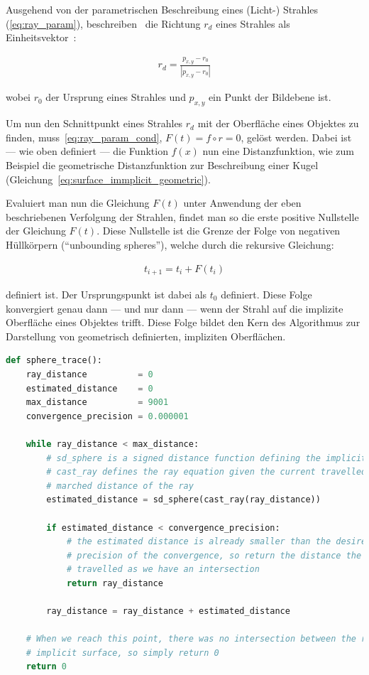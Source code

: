 Ausgehend von der parametrischen Beschreibung eines (Licht-) Strahles
(\autoref{eq:ray_param}), beschreiben~\citeauthor{hart_ray_1989} die
Richtung $r_{d}$ eines Strahles als Einheitsvektor~\parencite[S.
291]{hart_ray_1989}:

\begin{gather}
    r_{d} = \frac{p_{x, y} - r_{0}}{|p_{x, y} - r_{0}|}
\end{gather}

wobei $r_{0}$ der Ursprung eines Strahles und $p_{x, y}$ ein Punkt der Bildebene ist.

Um nun den Schnittpunkt eines Strahles $r_{d}$ mit der Oberfläche eines
Objektes zu finden, muss~\autoref{eq:ray_param_cond}, $F(t) = f \circ
r = 0$, gelöst werden. Dabei ist --- wie oben definiert --- die Funktion
$f(x)$ nun eine Distanzfunktion, wie zum Beispiel die geometrische
Distanzfunktion zur Beschreibung einer Kugel
(Gleichung~\ref{eq:surface_immplicit_geometric}).

Evaluiert man nun die Gleichung $F(t)$ unter Anwendung der eben beschriebenen
Verfolgung der Strahlen, findet man so die erste positive Nullstelle der Gleichung
$F(t)$. Diese Nullstelle ist die Grenze der Folge von negativen Hüllkörpern
(``unbounding spheres''), welche durch die rekursive Gleichung:

\begin{gather}
    t_{i+1} = t_{i} + F(t_{i})
\end{gather}

definiert ist. Der Ursprungspunkt ist dabei als $t_{0}$ definiert. Diese Folge
konvergiert genau dann --- und nur dann --- wenn der Strahl auf die implizite
Oberfläche eines Objektes trifft. Diese Folge bildet den Kern des Algorithmus
zur Darstellung von geometrisch definierten, impliziten Oberflächen.

\begin{lstlisting}[language=Python,caption={Eine abstrakte Umsetzung des Sphere
        Tracings\protect\footnotemark.},label={alg:sphere_tracing},captionpos=b,emph={sphere_trace}]
def sphere_trace():
    ray_distance          = 0
    estimated_distance    = 0
    max_distance          = 9001
    convergence_precision = 0.000001

    while ray_distance < max_distance:
        # sd_sphere is a signed distance function defining the implicit surface
        # cast_ray defines the ray equation given the current travelled /
        # marched distance of the ray
        estimated_distance = sd_sphere(cast_ray(ray_distance))

        if estimated_distance < convergence_precision:
            # the estimated distance is already smaller than the desired
            # precision of the convergence, so return the distance the ray has
            # travelled as we have an intersection
            return ray_distance

        ray_distance = ray_distance + estimated_distance

    # When we reach this point, there was no intersection between the ray and a
    # implicit surface, so simply return 0
    return 0
\end{lstlisting}
